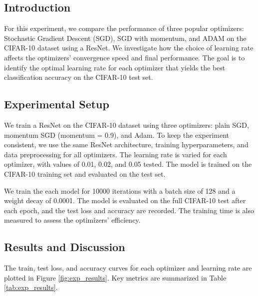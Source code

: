 \documentclass{article}
\begin{document}
\subsection*{Introduction}
For this experiment, we compare the performance of three popular optimizers: Stochastic Gradient Descent (SGD), SGD with momentum, and ADAM on the CIFAR-10 dataset using a ResNet. We investigate how the choice of learning rate affects the optimizers' convergence speed and final performance. The goal is to identify the optimal learning rate for each optimizer that yields the best classification accuracy on the CIFAR-10 test set.

\subsection*{Experimental Setup}
We train a ResNet on the CIFAR-10 dataset using three optimizers: plain SGD, momentum SGD (momentum = 0.9), and Adam. To keep the experiment consistent, we use the same ResNet architecture, training hyperparameters, and data preprocessing for all optimizers. The learning rate is varied for each optimizer, with values of 0.01, 0.02, and 0.05 tested. The model is trained on the CIFAR-10 training set and evaluated on the test set.

We train the each model for 10000 iterations with a batch size of 128 and a weight decay of 0.0001. The model is evaluated on the full CIFAR-10 test after each epoch, and the test loss and accuracy are recorded. The training time is also measured to assess the optimizers' efficiency.

\subsection*{Results and Discussion}

The train, test loss, and accuracy curves for each optimizer and learning rate are plotted in Figure \ref{fig:exp_results}. Key metrics are summarized in Table \ref{tab:exp_results}.
\end{document}
